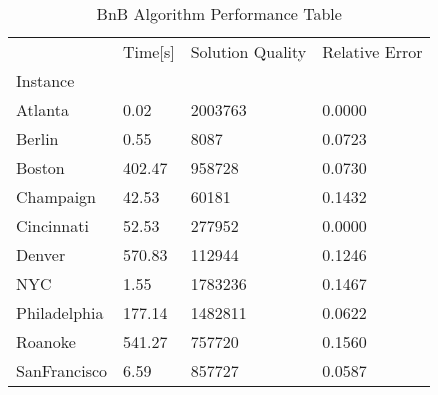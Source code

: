 \begin{table}
\caption{ BnB Algorithm Performance Table }
\begin{tabular}{llll}
\toprule
{} & Time[s] & Solution Quality & Relative Error \\
Instance     &         &                  &                \\
\midrule
Atlanta      &    0.02 &          2003763 &         0.0000 \\
Berlin       &    0.55 &             8087 &         0.0723 \\
Boston       &  402.47 &           958728 &         0.0730 \\
Champaign    &   42.53 &            60181 &         0.1432 \\
Cincinnati   &   52.53 &           277952 &         0.0000 \\
Denver       &  570.83 &           112944 &         0.1246 \\
NYC          &    1.55 &          1783236 &         0.1467 \\
Philadelphia &  177.14 &          1482811 &         0.0622 \\
Roanoke      &  541.27 &           757720 &         0.1560 \\
SanFrancisco &    6.59 &           857727 &         0.0587 \\
\bottomrule
\end{tabular}
\end{table}
